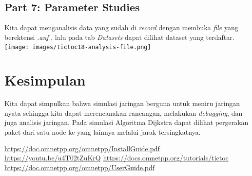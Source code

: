 \documentclass[conference]{IEEEtran}
\begin{document}
\subsection{Part 7: Parameter Studies}
Kita dapat menganalisis data yang sudah di \textit{record} dengan membuka \textit{file} yang berektensi \textit{.anf} , lalu pada tab \textit{Datasets} dapat dilihat dataset yang terdaftar.
\texttt{[image: images/tictoc18-analysis-file.png]}

\section{Kesimpulan}
Kita dapat simpulkan bahwa simulasi jaringan berguna untuk meniru jaringan nyata sehingga kita dapat merencanakan rancangan, melakukan \textit{debugging}, dan juga analisis jaringan. Pada simulasi Algoritma Dijkstra dapat dilihat pergerakan paket dari satu node ke yang lainnya melalui jarak tersingkatnya.


\begin{thebibliography}{1}
	\url{https://doc.omnetpp.org/omnetpp/InstallGuide.pdf}
	\url{https://youtu.be/u4T02tZuKrQ}
	\url{https://docs.omnetpp.org/tutorials/tictoc}
	\url{https://doc.omnetpp.org/omnetpp/UserGuide.pdf}
\end{thebibliography}
\end{document}
